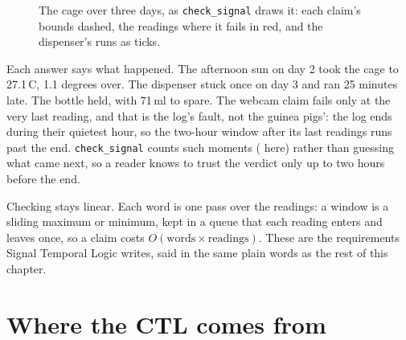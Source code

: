 \begin{figure}[ht]
\centering
{}
\caption{The cage over three days, as \texttt{check\_signal} draws it: each claim's bounds
dashed, the readings where it fails in red, and the dispenser's runs as ticks.}
\label{fig:signals}
\end{figure}

Each answer says what happened. The afternoon sun on day 2 took the cage to 27.1\,\textdegree C,
1.1 degrees over. The dispenser stuck once on day 3 and ran 25 minutes late. The bottle held,
with 71\,ml to spare. The webcam claim fails only at the very last reading, and that is the
log's fault, not the guinea pigs': the log ends during their quietest hour, so the two-hour
window after its last readings runs past the end. \texttt{check\_signal} counts such moments
( here) rather than guessing what came next, so a reader knows
to trust the verdict only up to two hours before the end.

Checking stays linear. Each word is one pass over the readings: a window is a sliding maximum or
minimum, kept in a queue that each reading enters and leaves once, so a claim costs
$O(\text{words} \times \text{readings})$. These are the requirements Signal Temporal Logic
writes, said in the same plain words as the rest of this chapter.

\section{Where the CTL comes from}

